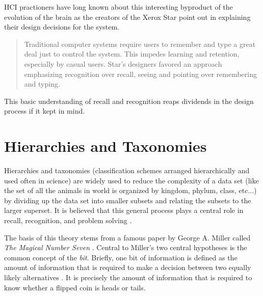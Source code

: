 HCI practioners have long known about this interesting byproduct of the evolution of the brain as the creators of the Xerox Star point out in explaining their design decisions for the system.

\begin{quote}
Traditional computer systems require users to remember and type a great deal just to control the system. This impedes learning and retention, especially by casual users. Star's designers favored an approach emphasizing recognition over recall, seeing and pointing over remembering and typing. \cite{xeroxstar1989}
\end{quote}

This basic understanding of recall and recognition reaps dividends in the design process if it kept in mind.

\section{Hierarchies and Taxonomies}

\begin{comment}
Papers:
Magic number seven, George Miller
recoding pg. 93
increasing bits per chunk
The Structure of the Information Visualization Design Space, Section 2
enclosure
Coding Recoding Hierarchical Information
Acquisiton and forgetting of hierarchically organized information
\end{comment}

Hierarchies and taxonomies (classification schemes arranged hierarchically and used often in science) are widely used to reduce the complexity of a data set (like the set of all the animals in world is organized by kingdom, phylum, class, etc...) by dividing up the data set into smaller subsets and relating the subsets to the larger superset. It is believed that this general process plays a central role in recall, recognition, and problem solving \cite{seven1956}\cite{graphicalhierarchy1972}\cite{hierarchical1971}. 

The basis of this theory stems from a famous paper by George A. Miller called \emph{The Magical Number Seven} \cite{seven1956}. Central to Miller's two central hypotheses is the common concept of the \emph{bit}. Briefly, one bit of information is defined as the amount of information that is required to make a decision between two equally likely alternatives \cite{seven1956}. It is precisely the amount of information that is required to know whether a flipped coin is heads or tails. 

